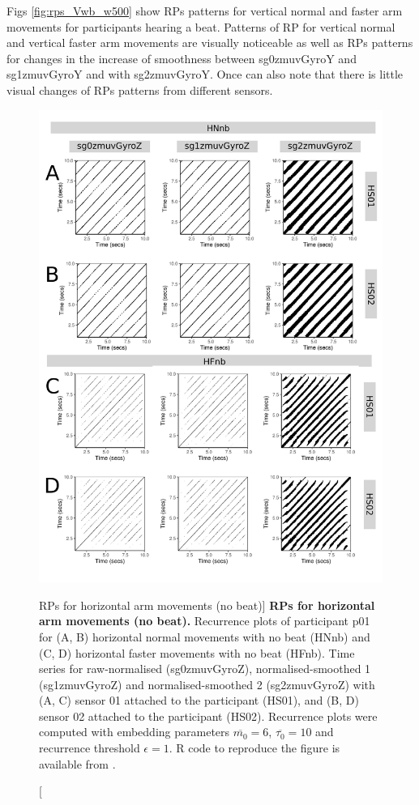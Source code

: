 Figs \ref{fig:rps_Vwb_w500} show RPs patterns for vertical normal and 
faster arm movements for participants hearing a beat. 
Patterns of RP for vertical normal and vertical faster arm movements are 
visually noticeable as well as RPs patterns for changes in 
the increase of smoothness between sg0zmuvGyroY and sg1zmuvGyroY and 
with sg2zmuvGyroY. Once can also note that there is little visual 
changes of RPs patterns from different sensors.
\begin{figure}
\centering
\includegraphics[height=0.8\textheight]{fig_5_09}
\caption
	[RPs for horizontal arm movements (no beat)]{
	{\bf RPs for horizontal arm movements (no beat).}	
	Recurrence plots of participant p01 for 
	(A, B) horizontal normal movements with no beat (HNnb) and
	(C, D) horizontal faster movements with no beat (HFnb).
	Time series for raw-normalised (sg0zmuvGyroZ), 
	normalised-smoothed 1 (sg1zmuvGyroZ) and 
	normalised-smoothed 2 (sg2zmuvGyroZ) with
	(A, C) sensor 01 attached to the participant (HS01), and
	(B, D) sensor 02 attached to the participant (HS02).
	Recurrence plots were computed with 
	embedding parameters $\overline{m_0}=6$, $\overline{\tau_0}=10$ and 
	recurrence threshold $\epsilon=1$.
	R code to reproduce the figure is available from \cite{xochicale2018}.
        }
    \label{fig:rps_Hnb_w500}
\end{figure}

